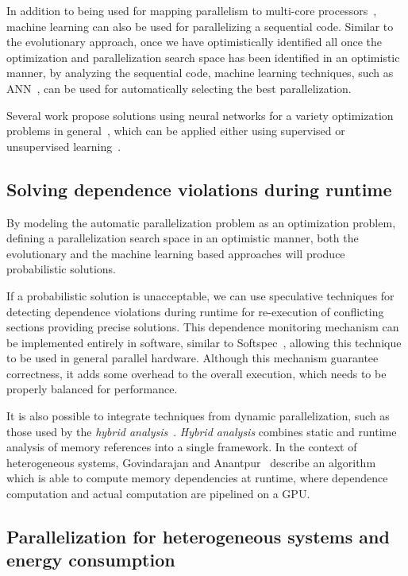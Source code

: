 \documentclass[a4paper,12pt]{article}
\begin{document}
In addition to being used for mapping parallelism to multi-core
processors~\cite{wang09,tournavitis09,wang14a}, machine learning can also be
used for parallelizing a sequential code.  Similar to the evolutionary
approach, once we have optimistically identified all once the optimization and
parallelization search space has been identified in an optimistic manner, by
analyzing the sequential code, machine learning techniques, such as
ANN~\cite{ohlsson93,wang99}, can be used for automatically selecting the best
parallelization.

Several work propose solutions using neural networks for a variety optimization
problems in general~\cite{ohlsson93,wang99,smith99}, which can be applied
either using supervised or unsupervised
learning~\cite{bengio07}.

\subsection{Solving dependence violations during runtime}

By modeling the automatic parallelization problem as an optimization problem,
defining a parallelization search space in an optimistic manner, both the
evolutionary and the machine learning based approaches will produce
probabilistic solutions.

If a probabilistic solution is unacceptable, we can use speculative techniques
for detecting dependence violations during runtime for re-execution of
conflicting sections providing precise solutions.  This dependence monitoring
mechanism can be implemented entirely in software, similar to
Softspec~\cite{bruening98}, allowing this technique to be used in general
parallel hardware.  Although this mechanism guarantee correctness, it adds some
overhead to the overall execution, which needs to be properly balanced for
performance.

It is also possible to integrate techniques from dynamic parallelization, such
as those used by the \emph{hybrid analysis}~\cite{rus03}. \emph{Hybrid
analysis} combines static and runtime analysis of memory references into a
single framework.  In the context of heterogeneous systems, Govindarajan and
Anantpur~\cite{govindarajan13} describe an algorithm which is able to compute
memory dependencies at runtime, where dependence computation and actual
computation are pipelined on a GPU.

\subsection{Parallelization for heterogeneous systems and energy consumption}
\end{document}
